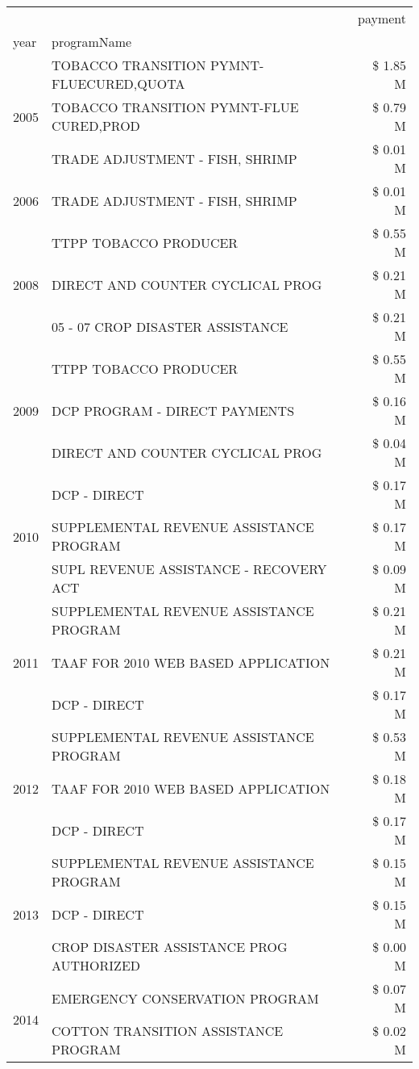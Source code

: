 \begin{tabular}{llr}
\toprule
 &  & payment \\
year & programName &  \\
\midrule
\multirow[t]{3}{*}{2005} & TOBACCO TRANSITION PYMNT-FLUECURED,QUOTA & \$ 1.85 M \\
 & TOBACCO TRANSITION PYMNT-FLUE CURED,PROD & \$ 0.79 M \\
 & TRADE ADJUSTMENT - FISH, SHRIMP & \$ 0.01 M \\
\cline{1-3}
2006 & TRADE ADJUSTMENT - FISH, SHRIMP & \$ 0.01 M \\
\cline{1-3}
\multirow[t]{3}{*}{2008} & TTPP TOBACCO PRODUCER & \$ 0.55 M \\
 & DIRECT AND COUNTER CYCLICAL PROG & \$ 0.21 M \\
 & 05 - 07 CROP DISASTER ASSISTANCE & \$ 0.21 M \\
\cline{1-3}
\multirow[t]{3}{*}{2009} & TTPP TOBACCO PRODUCER & \$ 0.55 M \\
 & DCP PROGRAM - DIRECT PAYMENTS & \$ 0.16 M \\
 & DIRECT AND COUNTER CYCLICAL PROG & \$ 0.04 M \\
\cline{1-3}
\multirow[t]{3}{*}{2010} & DCP - DIRECT & \$ 0.17 M \\
 & SUPPLEMENTAL REVENUE ASSISTANCE PROGRAM & \$ 0.17 M \\
 & SUPL REVENUE ASSISTANCE - RECOVERY ACT & \$ 0.09 M \\
\cline{1-3}
\multirow[t]{3}{*}{2011} & SUPPLEMENTAL REVENUE ASSISTANCE PROGRAM & \$ 0.21 M \\
 & TAAF FOR 2010 WEB BASED APPLICATION & \$ 0.21 M \\
 & DCP - DIRECT & \$ 0.17 M \\
\cline{1-3}
\multirow[t]{3}{*}{2012} & SUPPLEMENTAL REVENUE ASSISTANCE PROGRAM & \$ 0.53 M \\
 & TAAF FOR 2010 WEB BASED APPLICATION & \$ 0.18 M \\
 & DCP - DIRECT & \$ 0.17 M \\
\cline{1-3}
\multirow[t]{3}{*}{2013} & SUPPLEMENTAL REVENUE ASSISTANCE PROGRAM & \$ 0.15 M \\
 & DCP - DIRECT & \$ 0.15 M \\
 & CROP DISASTER ASSISTANCE PROG AUTHORIZED & \$ 0.00 M \\
\cline{1-3}
\multirow[t]{3}{*}{2014} & EMERGENCY CONSERVATION PROGRAM & \$ 0.07 M \\
 & COTTON TRANSITION ASSISTANCE PROGRAM & \$ 0.02 M \\

\end{tabular}
